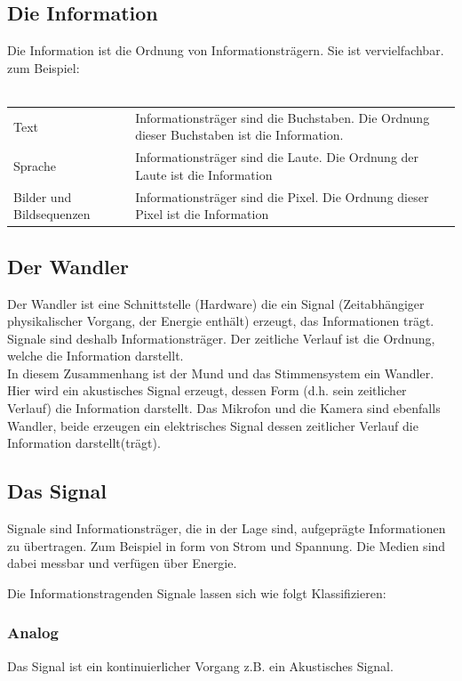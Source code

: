 \documentclass[a4paper,10pt]{article}
\begin{document}
\subsection{Die Information}
Die Information ist die Ordnung von Informationsträgern. Sie ist vervielfachbar.\\
zum Beispiel:\\\\
\begin{tabularx}{\textwidth}{lX}
  Text & Informationsträger sind die Buchstaben. Die Ordnung dieser Buchstaben ist die Information. \\
  Sprache & Informationsträger sind die Laute. Die Ordnung der Laute ist die Information \\
  Bilder und Bildsequenzen & Informationsträger sind die Pixel. Die Ordnung dieser Pixel ist die Information\\
\end{tabularx}

\subsection{Der Wandler}
Der Wandler ist eine Schnittstelle (Hardware) die ein Signal (Zeitabhängiger physikalischer Vorgang, der Energie enthält) erzeugt, das Informationen trägt.
Signale sind deshalb Informationsträger. Der zeitliche Verlauf ist die Ordnung, welche die Information darstellt.\\
In diesem Zusammenhang ist der Mund und das Stimmensystem ein Wandler. Hier wird ein akustisches Signal erzeugt, dessen Form (d.h. sein zeitlicher Verlauf) die Information darstellt.
Das Mikrofon und die Kamera sind ebenfalls Wandler, beide erzeugen ein elektrisches Signal dessen zeitlicher Verlauf die Information darstellt(trägt).


\subsection{Das Signal}
Signale sind Informationsträger, die in der Lage sind, aufgeprägte Informationen zu übertragen.
Zum Beispiel in form von Strom und Spannung. Die Medien sind dabei messbar und verfügen über Energie.

Die Informationstragenden Signale lassen sich wie folgt Klassifizieren:\\

\subsubsection{Analog}
Das Signal ist ein kontinuierlicher Vorgang z.B. ein Akustisches Signal.
\end{document}
